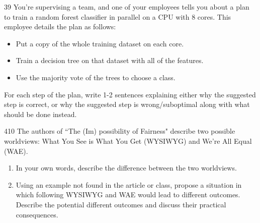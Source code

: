 \documentclass[11pt]{article}
\begin{document}
\begin{studentanswer}[20]
\end{studentanswer}



\begin{problem}{3}{9}
You’re supervising a team, and one of your employees tells you about a plan to train a random forest classifier in parallel on a CPU with 8 cores. This employee details the plan as follows: 
\begin{itemize}
    \item[(a)] Put a copy of the whole training dataset on each core.
    \item[(b)] Train a decision tree on that dataset with all of the features.
    \item[(c)] Use the majority vote of the trees to choose a class. 
\end{itemize}
For each step of the plan, write 1-2 sentences explaining either why the suggested step is correct, or why the suggested step is wrong/suboptimal along with what should be done instead.  

\end{problem}

\begin{studentanswer}[25]
\end{studentanswer}





\begin{problem}{4}{10}
The authors of ``The (Im) possibility of Fairness" describe two possible worldviews: What You See is What You Get (WYSIWYG) and We're All Equal (WAE).
\begin{enumerate}[label=(\alph*)]
\item In your own words, describe the difference between the two worldviews.
\item Using an example not found in the article or class, propose a situation in which following WYSIWYG and WAE would lead to different outcomes. Describe the potential different outcomes and discuss their practical consequences. 
\end{enumerate}
\end{problem}

\begin{studentanswer}[16]
\end{studentanswer}
\end{document}
